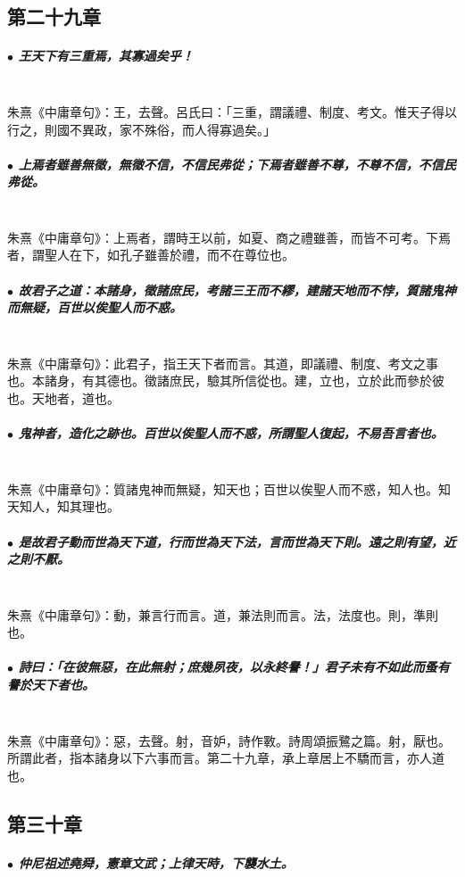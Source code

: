 \documentclass[hyperref, UTF8, 12pt, a4paper]{ctexrep}
\begin{document}
\newpage
\subsection{第二十九章}

\subparagraph{$\bullet$ 王天下有三重焉，其寡過矣乎！} ~\\

朱熹《中庸章句》：王，去聲。呂氏曰：「三重，謂議禮、制度、考文。惟天子得以行之，則國不異政，家不殊俗，而人得寡過矣。」

\subparagraph{$\bullet$ 上焉者雖善無徵，無徵不信，不信民弗從；下焉者雖善不尊，不尊不信，不信民弗從。} ~\\

朱熹《中庸章句》：上焉者，謂時王以前，如夏、商之禮雖善，而皆不可考。下焉者，謂聖人在下，如孔子雖善於禮，而不在尊位也。

\subparagraph{$\bullet$ 故君子之道：本諸身，徵諸庶民，考諸三王而不繆，建諸天地而不悖，質諸鬼神而無疑，百世以俟聖人而不惑。} ~\\

朱熹《中庸章句》：此君子，指王天下者而言。其道，即議禮、制度、考文之事也。本諸身，有其德也。徵諸庶民，驗其所信從也。建，立也，立於此而參於彼也。天地者，道也。

\subparagraph{$\bullet$ 鬼神者，造化之跡也。百世以俟聖人而不惑，所謂聖人復起，不易吾言者也。} ~\\

朱熹《中庸章句》：質諸鬼神而無疑，知天也；百世以俟聖人而不惑，知人也。知天知人，知其理也。

\subparagraph{$\bullet$ 是故君子動而世為天下道，行而世為天下法，言而世為天下則。遠之則有望，近之則不厭。} ~\\

朱熹《中庸章句》：動，兼言行而言。道，兼法則而言。法，法度也。則，準則也。

\subparagraph{$\bullet$ 詩曰：「在彼無惡，在此無射；庶幾夙夜，以永終譽！」君子未有不如此而蚤有譽於天下者也。} ~\\

朱熹《中庸章句》：惡，去聲。射，音妒，詩作斁。詩周頌振鷺之篇。射，厭也。所謂此者，指本諸身以下六事而言。第二十九章，承上章居上不驕而言，亦人道也。

\newpage
\subsection{第三十章}

\subparagraph{$\bullet$ 仲尼祖述堯舜，憲章文武；上律天時，下襲水土。} ~\\
\end{document}
